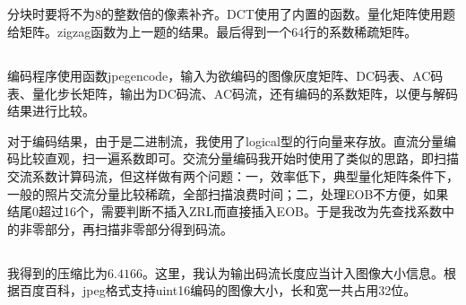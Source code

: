 \documentclass{article}
\begin{document}
\subsection{}
\noindent{}
\par 
分块时要将不为8的整数倍的像素补齐。DCT使用了内置的函数。量化矩阵使用题给矩阵。zigzag函数为上一题的结果。最后得到一个64行的系数稀疏矩阵。

\subsection{}
\noindent{}
\par 编码程序使用函数jpegencode，输入为欲编码的图像灰度矩阵、DC码表、AC码表、量化步长矩阵，输出为DC码流、AC码流，还有编码的系数矩阵，以便与解码结果进行比较。\par 对于编码结果，由于是二进制流，我使用了logical型的行向量来存放。直流分量编码比较直观，扫一遍系数即可。交流分量编码我开始时使用了类似的思路，即扫描交流系数计算码流，但这样做有两个问题：一，效率低下，典型量化矩阵条件下，一般的照片交流分量比较稀疏，全部扫描浪费时间；二，处理EOB不方便，如果结尾0超过16个，需要判断不插入ZRL而直接插入EOB。于是我改为先查找系数中的非零部分，再扫描非零部分得到码流。

\subsection{}
\noindent{}
\par 我得到的压缩比为$6.4166$。这里，我认为输出码流长度应当计入图像大小信息。根据百度百科，jpeg格式支持uint16编码的图像大小，长和宽一共占用32位。
\end{document}
